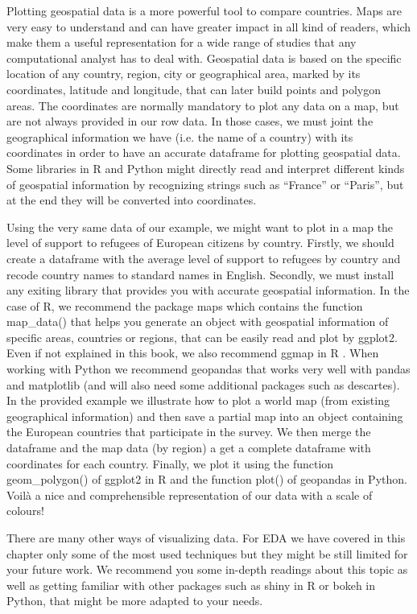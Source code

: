
Plotting geospatial data is a more powerful tool to compare countries.  Maps are very easy to understand and can have greater impact in all kind of readers, which make them a useful representation for a wide range of studies that any computational analyst has to deal with. Geospatial data is based on the specific location of any country, region, city or geographical area, marked by its coordinates, latitude and longitude, that can later build points and polygon areas. The coordinates are normally mandatory to plot any data on a map, but are not always provided in our row data. In those cases, we must joint the geographical information we have (i.e. the name of a country) with its coordinates in order to have an accurate dataframe for plotting geospatial data. Some libraries in R and Python might directly read and interpret different kinds of geospatial information by recognizing strings such as “France” or “Paris”, but at the end they will be converted into coordinates. 

Using the very same data of our example, we might want to plot in a map the level of support to refugees of European citizens by country. Firstly, we should create a dataframe with the average level of support to refugees by country and recode country names to standard names in English. Secondly, we must install any exiting library that provides you with accurate geospatial information. In the case of R, we recommend the package maps which contains the function map\_data() that helps you generate an object with geospatial information of specific areas, countries or regions, that can be easily read and plot by ggplot2. Even if not explained in this book, we also recommend ggmap in R \cite{kahle2013ggmap}. When working with Python we recommend geopandas that works very well with pandas and matplotlib (and will also need some additional packages such as descartes).  In the provided example we illustrate how to plot a world map (from existing geographical information) and then save a partial map into an object containing the European countries that participate in the survey. We then merge the dataframe and the map data (by region) a get a complete dataframe with coordinates for each country.  Finally, we plot it using the function geom\_polygon() of ggplot2 in R and the function plot() of geopandas in Python. Voilà a nice and comprehensible representation of our data with a scale of colours!


There are many other ways of visualizing data. For EDA we have covered in this chapter only some of the most used techniques but they might be still limited for your future work. We recommend you some in-depth readings about this topic\cite{tufte2006beautiful}\cite{cairo2019charts} as well as getting familiar with other packages such as shiny in R or bokeh in Python, that might be more adapted to your needs.

